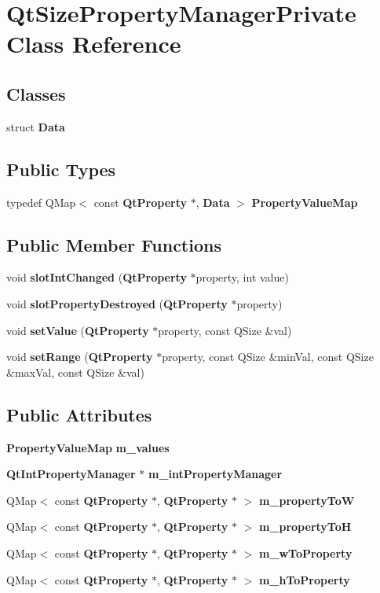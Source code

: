 \section{Qt\+Size\+Property\+Manager\+Private Class Reference}
\label{classQtSizePropertyManagerPrivate}
\subsection*{Classes}
\begin{DoxyCompactItemize}
\item 
struct {\bf Data}
\end{DoxyCompactItemize}
\subsection*{Public Types}
\begin{DoxyCompactItemize}
\item 
typedef Q\+Map$<$ const {\bf Qt\+Property} $\ast$, {\bf Data} $>$ {\bf Property\+Value\+Map}
\end{DoxyCompactItemize}
\subsection*{Public Member Functions}
\begin{DoxyCompactItemize}
\item 
void {\bf slot\+Int\+Changed} ({\bf Qt\+Property} $\ast$property, int value)
\item 
void {\bf slot\+Property\+Destroyed} ({\bf Qt\+Property} $\ast$property)
\item 
void {\bf set\+Value} ({\bf Qt\+Property} $\ast$property, const Q\+Size \&val)
\item 
void {\bf set\+Range} ({\bf Qt\+Property} $\ast$property, const Q\+Size \&min\+Val, const Q\+Size \&max\+Val, const Q\+Size \&val)
\end{DoxyCompactItemize}
\subsection*{Public Attributes}
\begin{DoxyCompactItemize}
\item 
{\bf Property\+Value\+Map} {\bf m\+\_\+values}
\item 
{\bf Qt\+Int\+Property\+Manager} $\ast$ {\bf m\+\_\+int\+Property\+Manager}
\item 
Q\+Map$<$ const {\bf Qt\+Property} $\ast$, {\bf Qt\+Property} $\ast$ $>$ {\bf m\+\_\+property\+ToW}
\item 
Q\+Map$<$ const {\bf Qt\+Property} $\ast$, {\bf Qt\+Property} $\ast$ $>$ {\bf m\+\_\+property\+ToH}
\item 
Q\+Map$<$ const {\bf Qt\+Property} $\ast$, {\bf Qt\+Property} $\ast$ $>$ {\bf m\+\_\+w\+To\+Property}
\item 
Q\+Map$<$ const {\bf Qt\+Property} $\ast$, {\bf Qt\+Property} $\ast$ $>$ {\bf m\+\_\+h\+To\+Property}
\end{DoxyCompactItemize}


